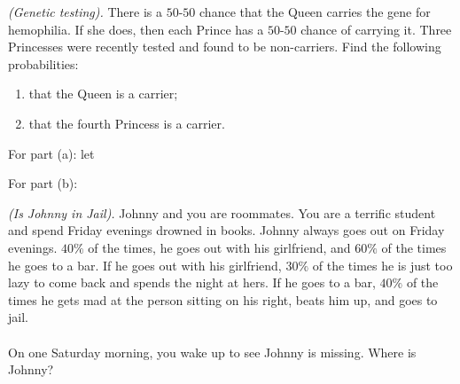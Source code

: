 \begin{problem}[Handout 5, \# 2]
  \emph{(Genetic testing).} There is a \(50\)-\(50\) chance that the Queen
  carries the gene for hemophilia. If she does, then each Prince has a
  \(50\)-\(50\) chance of carrying it. Three Princesses were recently
  tested and found to be non-carriers. Find the following probabilities:
  \begin{enumerate}[label=(\alph*),noitemsep]
  \item that the Queen is a carrier;
  \item that the fourth Princess is a carrier.
  \end{enumerate}
\end{problem}
\begin{solution}
  For part (a): let

  For part (b):
\end{solution}
\newpage

\begin{problem}[Handout 5, \# 4]
  \emph{(Is Johnny in Jail).} Johnny and you are roommates. You are a
  terrific student and spend Friday evenings drowned in books. Johnny
  always goes out on Friday evenings. \(40\%\) of the times, he goes out
  with his girlfriend, and \(60\%\) of the times he goes to a bar. If he
  goes out with his girlfriend, \(30\%\) of the times he is just too lazy
  to come back and spends the night at hers. If he goes to a bar, \(40\%\)
  of the times he gets mad at the person sitting on his right, beats him
  up, and goes to jail.
  \\\\
  On one Saturday morning, you wake up to see Johnny is missing. Where is
  Johnny?
\end{problem}
\begin{solution}

\end{solution}

